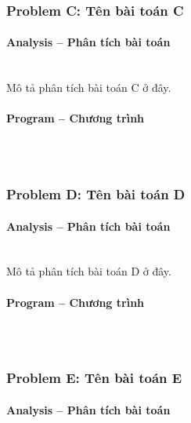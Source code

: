 \documentclass{article}
\begin{document}
\subsubsection{Problem C: Tên bài toán C}

\paragraph{Analysis -- Phân tích bài toán} \mbox{} \\

Mô tả phân tích bài toán C ở đây.

\paragraph{Program -- Chương trình} \mbox{} \\

\begin{lstlisting}

\end{lstlisting}

\subsubsection{Problem D: Tên bài toán D}

\paragraph{Analysis -- Phân tích bài toán} \mbox{} \\

Mô tả phân tích bài toán D ở đây.

\paragraph{Program -- Chương trình} \mbox{} \\

\begin{lstlisting}

\end{lstlisting}

\subsubsection{Problem E: Tên bài toán E}

\paragraph{Analysis -- Phân tích bài toán} \mbox{} \\
\end{document}
